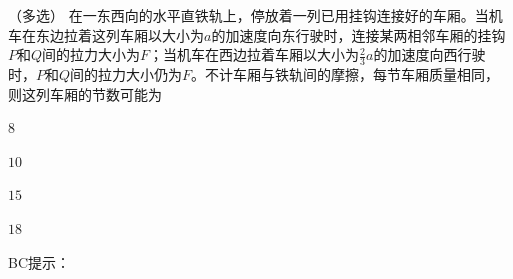 （多选）
在一东西向的水平直铁轨上，停放着一列已用挂钩连接好的车厢。当机车在东边拉着这列车厢以大小为\(a\)的加速度向东行驶时，连接某两相邻车厢的挂钩\(P\)和\(Q\)间的拉力大小为\(F\)；当机车在西边拉着车厢以大小为\(\frac{2}{3}a\)的加速度向西行驶时，\(P\)和\(Q\)间的拉力大小仍为\(F\)。不计车厢与铁轨间的摩擦，每节车厢质量相同，则这列车厢的节数可能为\paren[]
\begin{choices}
	\item \(8\)
	\item \(10\)
	\item \(15\)
	\item \(18\)
\end{choices}
\begin{answer}
	BC\qquad 提示：
\end{answer}